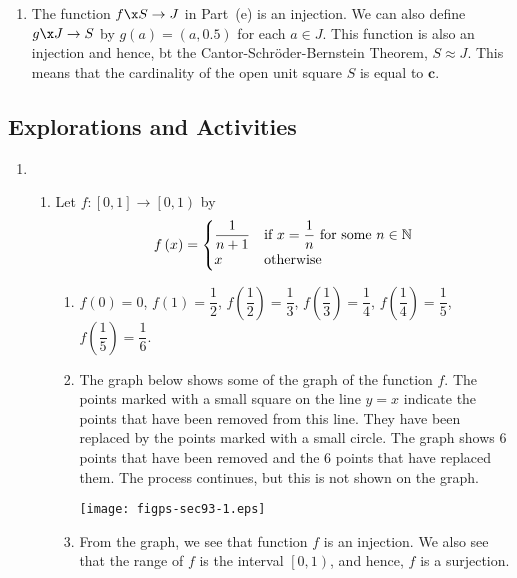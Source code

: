 \begin{enumerate}
\begin{enumerate}
\item The function $f\x S \to J$ in Part~(e) is an injection.  We can also define 
$g\x J \to S$ by $g(a) = (a, 0.5)$ for each $a \in J$.  This function is also an injection and hence, bt the Cantor-Schr\"{o}der-Bernstein Theorem, \linebreak
$S \approx J$.  This means that the cardinality of the open unit square $S$ is equal to $\boldsymbol{c}$.
\end{enumerate}
\end{enumerate}


\subsection*{Explorations and Activities}
\setcounter{oldenumi}{\theenumi}
\begin{enumerate} \setcounter{enumi}{\theoldenumi}
\item \begin{enumerate}
\item Let $f: \left[ 0, 1 \right] \to \left[ 0, 1 \right)$ by
\begin{equation} \notag
f \left( x \right) = 
\begin{cases}
\dfrac{1}{n+1}         &\text{if $x=\dfrac{1}{n}$ for some $n \in \mathbb{N}$} \\
x        &\text{otherwise}
\end{cases}
\end{equation}
\begin{enumerate}
\item 
$f \left( 0 \right) = 0$,
$f \left( 1 \right) = \dfrac{1}{2}$, 
$f \left( \dfrac{1}{2} \right) = \dfrac{1}{3}$, 
$f \left( \dfrac{1}{3} \right) = \dfrac{1}{4}$, 
$f \left( \dfrac{1}{4} \right) = \dfrac{1}{5}$,
$f \left( \dfrac{1}{5} \right) = \dfrac{1}{6}$.

\item The graph below shows some of the graph of the function $f$.  The points marked with a small square on the line $y = x$ indicate the points that have been removed from this line.  They have been replaced by the points marked with a small circle.  The graph shows 6 points that have been removed and the 6 points that have replaced them.  The process continues, but this is not shown on the graph.
%
\begin{center}
\texttt{[image: figps-sec93-1.eps]}
\end{center}
%
\item From the graph, we see that function $f$ is an injection.  We also see that the range of 
$f$ is the interval $\left[ 0, 1 \right)$, and hence, $f$ is a surjection.  


\end{enumerate}
\end{enumerate}
\end{enumerate}
